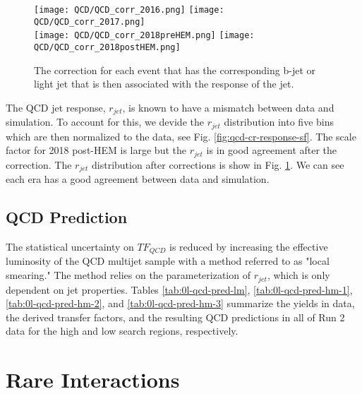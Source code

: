\begin{figure}
	\begin{center}
  \texttt{[image: QCD/QCD\_corr\_2016.png]}
  \texttt{[image: QCD/QCD\_corr\_2017.png]} \\
  \texttt{[image: QCD/QCD\_corr\_2018preHEM.png]}
  \texttt{[image: QCD/QCD\_corr\_2018postHEM.png]} \\
	\end{center}
	\caption[QCD Jet Response Correction]{The correction for each event that has the corresponding b-jet or light jet that is then associated with the response of the jet. }
	\label{fig:qcd-cr-response-corr}
\end{figure}

The QCD jet response, $r_{jet}$, is known to have a mismatch between data and simulation. To account for this, we devide the $r_{jet}$ distribution into five bins which are then normalized to the data, see Fig. \ref{fig:qcd-cr-response-sf}. The scale factor for 2018 post-HEM is large but the $r_{jet}$ is in good agreement after the correction. The $r_{jet}$ distribution after corrections is show in Fig. \ref{fig:qcd-cr-response-corr}. We can see each era has a good agreement between data and simulation.

\subsection{QCD Prediction}\label{sec:QCDPred}

The statistical uncertainty on $TF_{QCD}$ is reduced by increasing the effective luminosity of the QCD multijet sample with a method referred to as "local smearing." The method relies on the parameterization of $r_{jet}$, which is only dependent on jet properties. Tables \ref{tab:0l-qcd-pred-lm}, \ref{tab:0l-qcd-pred-hm-1}, \ref{tab:0l-qcd-pred-hm-2}, and \ref{tab:0l-qcd-pred-hm-3} summarize the yields in data, the derived transfer factors, and the resulting QCD predictions in all \datalumi{} of Run 2 data for the high \dm{} and low \dm{} search regions, respectively. 






\section{Rare Interactions}
\label{subsec:rare}

